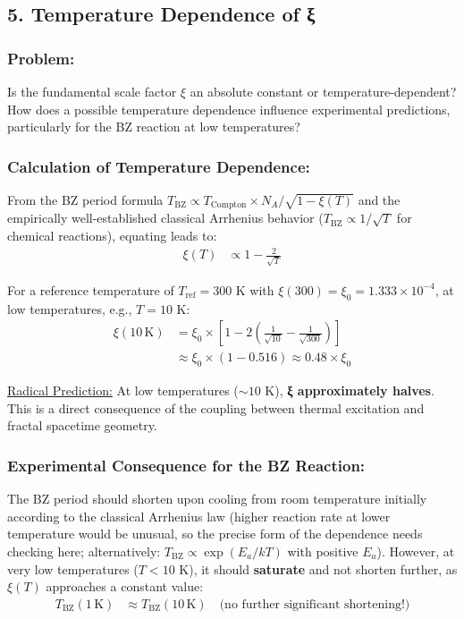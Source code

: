 	\subsection*{5. Temperature Dependence of ξ}
	
	\subsubsection*{Problem:}
	Is the fundamental scale factor $\xi$ an absolute constant or temperature-dependent? How does a possible temperature dependence influence experimental predictions, particularly for the BZ reaction at low temperatures?
	
	\subsubsection*{Calculation of Temperature Dependence:}
	
	From the BZ period formula $T_{\text{BZ}} \propto T_{\text{Compton}} \times N_A / \sqrt{1 - \xi(T)}$ and the empirically well-established classical Arrhenius behavior ($T_{\text{BZ}} \propto 1/\sqrt{T}$ for chemical reactions), equating leads to:
	\begin{align*}
		\xi(T) &\propto 1 - \frac{2}{\sqrt{T}}
	\end{align*}
	
	For a reference temperature of $T_{\text{ref}} = 300$ K with $\xi(300) = \xi_0 = 1.333 \times 10^{-4}$, at low temperatures, e.g., $T = 10$ K:
	\begin{align*}
		\xi(10 \, \text{K}) &= \xi_0 \times \left[1 - 2\left(\frac{1}{\sqrt{10}} - \frac{1}{\sqrt{300}}\right)\right] \\
		&\approx \xi_0 \times (1 - 0.516) \approx 0.48 \times \xi_0
	\end{align*}
	
	\underline{Radical Prediction:} At low temperatures ($\sim 10$ K), \textbf{ξ approximately halves}. This is a direct consequence of the coupling between thermal excitation and fractal spacetime geometry.
	
	\subsubsection*{Experimental Consequence for the BZ Reaction:}
	
	The BZ period should shorten upon cooling from room temperature initially according to the classical Arrhenius law (higher reaction rate at lower temperature would be unusual, so the precise form of the dependence needs checking here; alternatively: $T_{\text{BZ}} \propto \exp(E_a/kT)$ with positive $E_a$). However, at very low temperatures ($T < 10$ K), it should \textbf{saturate} and not shorten further, as $\xi(T)$ approaches a constant value:
	\begin{align*}
		T_{\text{BZ}}(1 \, \text{K}) &\approx T_{\text{BZ}}(10 \, \text{K}) \quad \text{(no further significant shortening!)}
	\end{align*}
	
